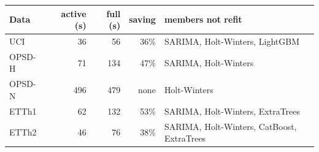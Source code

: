 \begin{tabular}{lrrrp{3.1cm}}
\toprule
Data & active (s) & full (s) & saving & members not refit \\
\midrule
UCI & 36 & 56 & 36\% & SARIMA, Holt-Winters, LightGBM \\
OPSD-H & 71 & 134 & 47\% & SARIMA, Holt-Winters \\
OPSD-N & 496 & 479 & none & Holt-Winters \\
ETTh1 & 62 & 132 & 53\% & SARIMA, Holt-Winters, ExtraTrees \\
ETTh2 & 46 & 76 & 38\% & SARIMA, Holt-Winters, CatBoost, ExtraTrees \\
\bottomrule
\end{tabular}
